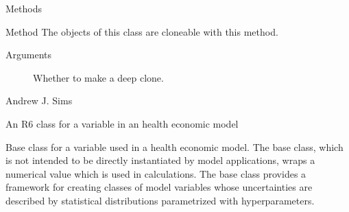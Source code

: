 \documentclass[a4paper]{book}
\begin{document}
\begin{Section}{Methods}
\hypertarget{method-clone}{}
%
\begin{SubSection}{Method }
The objects of this class are cloneable with this method.
%


%
\begin{SubSubSection}{Arguments}

\begin{description}

\item[] Whether to make a deep clone.

\end{description}


\end{SubSubSection}

\end{SubSection}

\end{Section}
%
\begin{Author}\relax
Andrew J. Sims 
\end{Author}
%
\begin{Description}\relax
An R6 class for a variable in an health economic model
\end{Description}
%
\begin{Details}\relax
Base class for a variable used in a health economic model. The base 
class, which is not intended to be directly instantiated by model
applications, wraps a numerical value which is used in calculations.
The base class provides a framework for creating classes of model
variables whose uncertainties are described by statistical distributions
parametrized with hyperparameters.
\end{Details}
%
\end{document}
